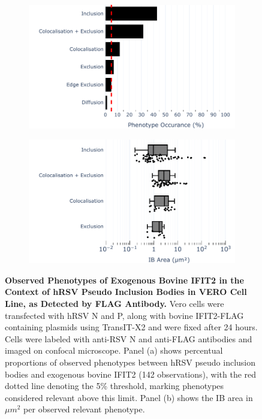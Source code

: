 \begin{figure}
    \begin{subfigure}{0.495\textwidth}
        \caption{}
        \includegraphics[width=1\linewidth]{08. Chapter 3/Figs/03. pIB/03. IFIT2/04. IFIT2-FLAG/03. FLAG/04. bar_bi2f_hnhp.pdf} 
    \end{subfigure}
    \begin{subfigure}{0.495\textwidth}
        \caption{}
        \includegraphics[width=1\linewidth]{08. Chapter 3/Figs/03. pIB/03. IFIT2/04. IFIT2-FLAG/03. FLAG/05. box_bi2f_hnhp.pdf}
    \end{subfigure}
    \caption[Observed Phenotypes of Exogenous Bovine IFIT2 in the Context of hRSV Pseudo Inclusion Bodies in VERO Cell Line, as Detected by FLAG Antibody.]{\textbf{Observed Phenotypes of Exogenous Bovine IFIT2 in the Context of hRSV Pseudo Inclusion Bodies in VERO Cell Line, as Detected by FLAG Antibody.} Vero cells were transfected with hRSV N and P, along with bovine IFIT2-FLAG containing plasmids using TransIT-X2 and were fixed after 24 hours. Cells were labeled with anti-RSV N and anti-FLAG antibodies and imaged on confocal microscope. Panel (a) shows percentual proportions of observed phenotypes between hRSV pseudo inclusion bodies and exogenous bovine IFIT2 (142 observations), with the red dotted line denoting the 5\% threshold, marking phenotypes considered relevant above this limit. Panel (b) shows the IB area in \(\mu m^2\) per observed relevant phenotype.}
    \label{fig:Observed Phenotypes of Exogenous Bovine IFIT2 in the Context of hRSV Pseudo Inclusion Bodies in VERO Cell Line, as Detected by FLAG Antibody}
\end{figure}

